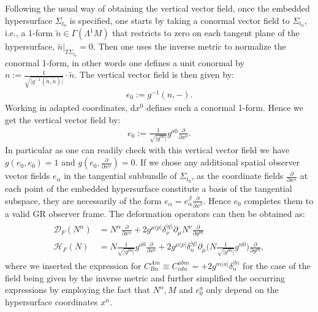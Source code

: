 Following the usual way of obtaining the vertical vector field, once the embedded hypersurface $\Sigma_{t_0}$ is specified, one starts by taking a conormal vector field to $\Sigma_{t_0}$, i.e., a 1-form $\tilde{n} \in \Gamma(\Lambda^1M)$ that restricts to zero on each tangent plane of the hypersurface, $\tilde{n} \vert_{T\Sigma_{t_0}} = 0$. Then one uses the inverse metric to normalize the conormal 1-form, in other words one defines a unit conormal by $n := \frac{1}{\sqrt{ \vert g^{-1}(\tilde{n},\tilde{n}) \vert }} \cdot \tilde{n}$. The vertical vector field is then given by: 
\begin{align}
e_0 := g^{-1}(n, - ). 
\end{align}
Working in adapted coordinates, $\mathrm{d}x^0$ defines such a conormal 1-form. Hence we get the vertical vector field by: 
\begin{align}
e_0 := \frac{1}{\sqrt{\vert g^{00} \vert }} g^{a0} \frac{\partial}{\partial x^a}.
\end{align}
In particular as one can readily check with this vertical vector field we have $g(e_0,e_0) = 1$ and $g(e_0,\frac{\partial}{\partial x^{\alpha}}) = 0$. If we chose any additional spatial observer vector fields $e_{\alpha}$ in the tangential subbundle of $\Sigma_{t_0}$, as the coordinate fields $\frac{\partial}{\partial x^{\alpha}}$ at each point of the embedded hypersurface constitute a basis of the tangential subspace, they are necessarily of the form $e_{\alpha} = e_{\alpha}^{\beta} \frac{\partial}{\partial x^{\beta}}$. Hence $e_0$ completes them to a valid GR observer frame.
The deformation operators can then be obtained as:
\begin{align}
    \begin{aligned}
    \mathcal{D}_F(N^{\alpha}) &= N^{\alpha} \frac{\partial}{\partial x^{\alpha}} + 2 g^{\mu (p\vert} \delta^{\vert q)}_{\nu} \partial_{\mu} N^{\nu} \frac{\partial}{\partial g ^{pq}} \\
    \mathcal{H}_F(N) &= N \frac{1}{\sqrt{\vert g^{00} \vert }} g^{a0} \frac{\partial}{\partial x^a} +2 g^{\mu (p\vert} \delta^{\vert q)}_{n} \partial_{\mu} \biggl (N \frac{1}{\sqrt{\vert g^{00} \vert }} g^{n0} \biggr )  \frac{\partial}{\partial g ^{pq}},
    \end{aligned}
\end{align}
where we inserted the expression for $C^{Am}_{Bn} \equiv C^{abm}_{cdn} = +2g^{m(a\vert}\delta^{\vert b)}_n$ for the case of the field being given by the inverse metric and further simplified the occurring expressions by employing the fact that $N^{\alpha},M$ and $e_0^a$ only depend on the hypersurface coordinates $x^\alpha$.

